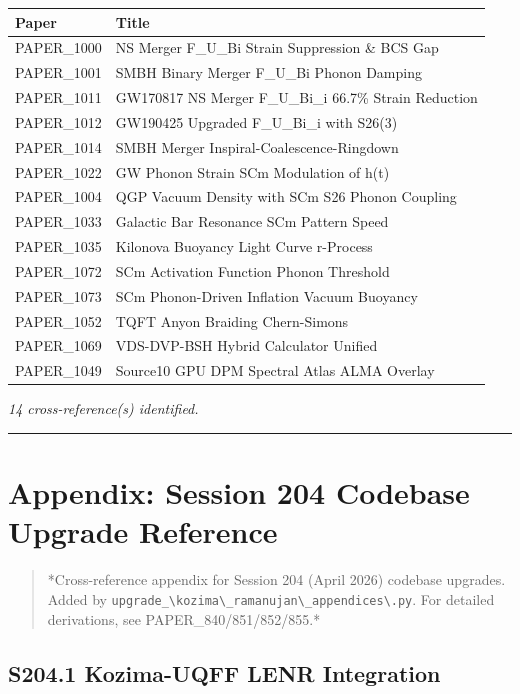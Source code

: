 \documentclass[12pt,a4paper]{article}
\begin{document}
\begin{table}[H]
\centering
\small
\begin{tabularx}{\linewidth}{@{}>{\raggedright\arraybackslash}X>{\raggedright\arraybackslash}X@{}}
\toprule
Paper & Title \tabularnewline
\midrule
PAPER\_1000 & NS Merger F\_{U\_Bi} Strain Suppression \& BCS Gap \tabularnewline
PAPER\_1001 & SMBH Binary Merger F\_{U\_Bi} Phonon Damping \tabularnewline
PAPER\_1011 & GW170817 NS Merger F\_{U\_Bi\_i} 66.7\% Strain Reduction \tabularnewline
PAPER\_1012 & GW190425 Upgraded F\_{U\_Bi\_i} with S26(3) \tabularnewline
PAPER\_1014 & SMBH Merger Inspiral-Coalescence-Ringdown \tabularnewline
PAPER\_1022 & GW Phonon Strain SCm Modulation of h(t) \tabularnewline
PAPER\_1004 & QGP Vacuum Density with SCm S26 Phonon Coupling \tabularnewline
PAPER\_1033 & Galactic Bar Resonance SCm Pattern Speed \tabularnewline
PAPER\_1035 & Kilonova Buoyancy Light Curve r-Process \tabularnewline
PAPER\_1072 & SCm Activation Function Phonon Threshold \tabularnewline
PAPER\_1073 & SCm Phonon-Driven Inflation Vacuum Buoyancy \tabularnewline
PAPER\_1052 & TQFT Anyon Braiding Chern-Simons \tabularnewline
PAPER\_1069 & VDS-DVP-BSH Hybrid Calculator Unified \tabularnewline
PAPER\_1049 & Source10 GPU DPM Spectral Atlas ALMA Overlay \tabularnewline
\bottomrule
\end{tabularx}
\end{table}

\emph{14 cross-reference(s) identified.}

\medskip\hrule\medskip

\section{Appendix: Session 204 Codebase Upgrade Reference}

\begin{quote}
*Cross-reference appendix for Session 204 (April 2026) codebase upgrades.
Added by \texttt{upgrade\_\textbackslash {kozima\textbackslash \_ramanujan\textbackslash \_appendices\textbackslash }.py}. For detailed derivations,
see PAPER\_840/851/852/855.*
\end{quote}

\subsection{S204.1 Kozima-UQFF LENR Integration}
\end{document}
